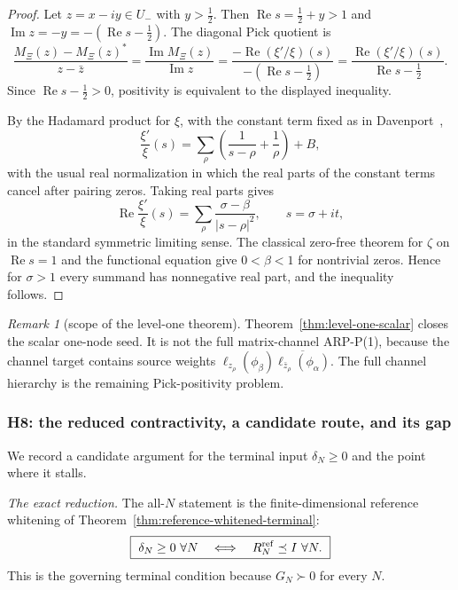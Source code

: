 \documentclass[11pt]{amsart}
\theoremstyle{definition}
\theoremstyle{remark}
\newtheorem{remark}[theorem]{Remark}
\theoremstyle{definition}
\renewcommand{\Re}{\operatorname{Re}}
\renewcommand{\Im}{\operatorname{Im}}
\newcommand{\half}{\tfrac{1}{2}}
\begin{document}
\begin{proof}
Let $z=x-iy\in U_-$ with $y>\half$.  Then $\Re s=\half+y>1$ and $\Im z=-y=-(\Re s-\half)$.  The diagonal Pick quotient is
\[
   \frac{M_\Xi(z)-M_\Xi(z)^*}{z-\bar z}
   =
   \frac{\Im M_\Xi(z)}{\Im z}
   =
   \frac{-\Re(\xi'/\xi)(s)}{-(\Re s-\half)}
   =
   \frac{\Re(\xi'/\xi)(s)}{\Re s-\half}.
\]
Since $\Re s-\half>0$, positivity is equivalent to the displayed inequality.

By the Hadamard product for $\xi$, with the constant term fixed as in
Davenport~\cite[Sec.~12]{Davenport},
\[
   \frac{\xi'}{\xi}(s)
   =
   \sum_\rho\left(\frac1{s-\rho}+\frac1\rho\right)+B,
\]
with the usual real normalization in which the real parts of the constant terms cancel after pairing
zeros.  Taking real parts gives
\[
   \Re\frac{\xi'}{\xi}(s)
   =
   \sum_\rho
   \frac{\sigma-\beta}{|s-\rho|^2},
   \qquad s=\sigma+it,
\]
in the standard symmetric limiting sense.  The classical zero-free theorem for $\zeta$ on
$\Re s=1$ and the functional equation give $0<\beta<1$ for nontrivial zeros.  Hence for $\sigma>1$ every
summand has nonnegative real part, and the inequality follows.
\end{proof}

\begin{remark}[scope of the level-one theorem]\label{rmk:level-one-scope}
Theorem~\ref{thm:level-one-scalar} closes the scalar one-node seed.  It is not the full matrix-channel
ARP-P(1), because the channel target contains source weights
$\ell_{z_\rho}(\phi_\beta)\overline{\ell_{\bar z_\rho}(\phi_\alpha)}$.  The full channel hierarchy is the
remaining Pick-positivity problem.
\end{remark}

\subsubsection*{H8: the reduced contractivity, a candidate route, and its gap}

We record a candidate argument for the terminal input $\delta_N\ge0$ and the point where it stalls.

\emph{The exact reduction.}  The all-$N$ statement is the finite-dimensional reference whitening of
Theorem~\ref{thm:reference-whitened-terminal}:
\[
   \boxed{\ \delta_N\ge0\ \forall N
   \quad\Longleftrightarrow\quad
   R_N^{\rm ref}\preceq I\ \forall N.\ }
\]
This is the governing terminal condition because $G_N\succ0$ for every $N$.
\end{document}
